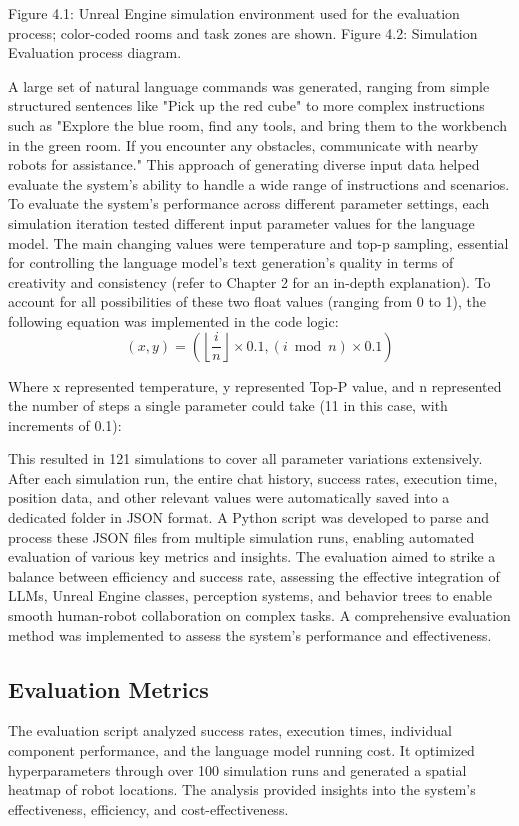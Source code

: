 \documentclass[pdflatex,sn-mathphys-num]{sn-jnl}%
\theoremstyle{thmstyleone}%
\theoremstyle{thmstyletwo}%
\theoremstyle{thmstylethree}%
\begin{document}
Figure 4.1: Unreal Engine simulation environment used for the evaluation process; color-coded rooms and task zones are shown.
Figure 4.2: Simulation Evaluation process diagram.


A large set of natural language commands was generated, ranging from simple structured sentences like "Pick up the red cube" to more complex instructions such as "Explore the blue room, find any tools, and bring them to the workbench in the green room. If you encounter any obstacles, communicate with nearby robots for assistance." This approach of generating diverse input data helped evaluate the system's ability to handle a wide range of instructions and scenarios.
To evaluate the system's performance across different parameter settings, each simulation iteration tested different input parameter values for the language model. The main changing values were temperature and top-p sampling, essential for controlling the language model's text generation's quality in terms of creativity and consistency (refer to Chapter 2 for an in-depth explanation).
To account for all possibilities of these two float values (ranging from 0 to 1), the following equation was implemented in the code logic:
\begin{equation}
(x, y) = \left(\left\lfloor\frac{i}{n}\right\rfloor \times 0.1, (i \bmod n) \times 0.1\right)
\end{equation}

Where x represented temperature, y represented Top-P value, and n represented the number of steps a single parameter could take (11 in this case, with increments of 0.1):

This resulted in 121 simulations to cover all parameter variations extensively.
After each simulation run, the entire chat history, success rates, execution time, position data, and other relevant values were automatically saved into a dedicated folder in JSON format. A Python script was developed to parse and process these JSON files from multiple simulation runs, enabling automated evaluation of various key metrics and insights.
The evaluation aimed to strike a balance between efficiency and success rate, assessing the effective integration of LLMs, Unreal Engine classes, perception systems, and behavior trees to enable smooth human-robot collaboration on complex tasks. A comprehensive evaluation method was implemented to assess the system's performance and effectiveness.
\subsection{Evaluation Metrics}
The evaluation script analyzed success rates, execution times, individual component performance, and the language model running cost. It optimized hyperparameters through over 100 simulation runs and generated a spatial heatmap of robot locations. The analysis provided insights into the system's effectiveness, efficiency, and cost-effectiveness.
\end{document}
